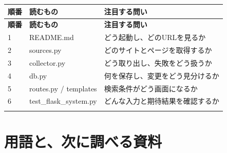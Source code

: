 \documentclass[a4paper,10pt]{ltjsarticle}
\begin{document}
{\small\begin{longtable}{@{}>{\raggedright\arraybackslash}p{}>{\raggedright\arraybackslash}p{}>{\raggedright\arraybackslash}p{}@{}}

\rowcolor{Pale}\textbf{順番} & \textbf{読むもの} & \textbf{注目する問い} \\ \midrule

\endfirsthead

\rowcolor{Pale}\textbf{順番} & \textbf{読むもの} & \textbf{注目する問い} \\ \midrule\endhead

1 & README.md & どう起動し、どのURLを見るか \\ \addlinespace[3pt]

2 & sources.py & どのサイトとページを取得するか \\ \addlinespace[3pt]

3 & collector.py & どう取り出し、失敗をどう扱うか \\ \addlinespace[3pt]

4 & db.py & 何を保存し、変更をどう見分けるか \\ \addlinespace[3pt]

5 & routes.py / templates & 検索条件がどう画面になるか \\ \addlinespace[3pt]

6 & test\_flask\_system.py & どんな入力と期待結果を確認するか \\ \addlinespace[3pt]

\bottomrule\end{longtable}}

\clearpage

\section*{用語と、次に調べる資料}
\end{document}
